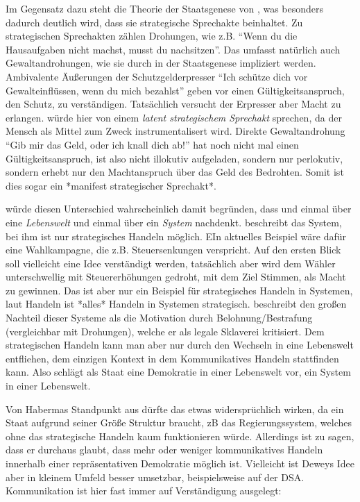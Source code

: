 Im Gegensatz dazu steht die Theorie der Staatsgenese von \citeauthor{Tilly-1985-aa}, was besonders dadurch deutlich wird, dass sie strategische Sprechakte beinhaltet.
Zu strategischen Sprechakten zählen Drohungen, wie z.B. ``Wenn du die Hausaufgaben nicht machst, musst du nachsitzen''.
Das umfasst natürlich auch Gewaltandrohungen, wie sie durch \citeauthor{Tilly-1985-aa} in der Staatsgenese impliziert werden.
Ambivalente Äußerungen der Schutzgelderpresser ``Ich schütze dich vor Gewalteinflüssen, wenn du mich bezahlst'' geben vor einen Gültigkeitsanspruch, den Schutz, zu verständigen.
Tatsächlich versucht der Erpresser aber Macht zu erlangen.
\citeauthor{Habermas-1998-aa} würde hier von einem \emph{latent strategischem Sprechakt} sprechen, da der Mensch als Mittel zum Zweck instrumentalisert wird.
Direkte Gewaltandrohung ``Gib mir das Geld, oder ich knall dich ab!'' hat noch nicht mal einen Gültigkeitsanspruch, ist also nicht illokutiv aufgeladen, sondern nur perlokutiv, sondern erhebt nur den Machtanspruch über das Geld des Bedrohten.
Somit ist dies sogar ein *manifest strategischer Sprechakt*.

\citeauthor{Habermas-1998-aa} würde diesen Unterschied wahrscheinlich damit begründen, dass \citeauthor{Tilly-1985-aa} und \citeauthor{Dewey2010} einmal über eine \emph{Lebenswelt} und einmal über ein \emph{System} nachdenkt.
\citeauthor{Tilly-1985-aa} beschreibt das System, bei ihm ist nur strategisches Handeln möglich.
EIn aktuelles Beispiel wäre dafür eine Wahlkampagne, die z.B. Steuersenkungen verspricht.
Auf den ersten Blick soll vielleicht eine Idee verständigt werden, tatsächlich aber wird dem Wähler unterschwellig mit Steuererhöhungen gedroht, mit dem Ziel Stimmen, als Macht zu gewinnen.
Das ist aber nur ein Beispiel für strategisches Handeln in Systemen, laut Handeln ist *alles* Handeln in Systemen strategisch.
\citeauthor{Dewey2010} beschreibt den großen Nachteil dieser Systeme als die Motivation durch Belohnung/Bestrafung (vergleichbar mit Drohungen), welche er als legale Sklaverei kritisiert.
Dem strategischen Handeln kann man aber nur durch den Wechseln in eine Lebenswelt entfliehen, dem einzigen Kontext in dem Kommunikatives Handeln stattfinden kann.
Also schlägt \citeauthor{Dewey2010} als Staat eine Demokratie in einer Lebenswelt vor, ein System in einer Lebenswelt.

Von Habermas Standpunkt aus dürfte das etwas widersprüchlich wirken, da ein Staat aufgrund seiner Größe Struktur braucht, zB das Regierungssystem, welches ohne das strategische Handeln kaum funktionieren würde.
Allerdings ist zu sagen, dass er durchaus glaubt, dass mehr oder weniger kommunikatives Handeln innerhalb einer repräsentativen Demokratie möglich ist.
Vielleicht ist Deweys Idee aber in kleinem Umfeld besser umsetzbar, beispielsweise auf der DSA.
Kommunikation ist hier fast immer auf Verständigung ausgelegt:

